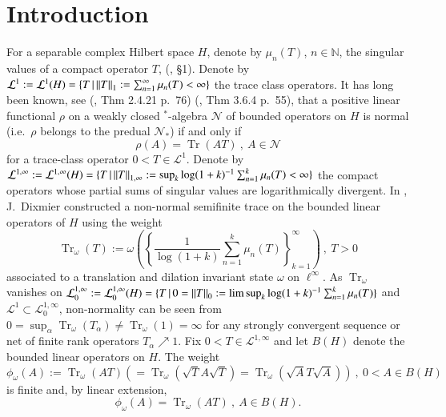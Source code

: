 \documentclass[final,1p]{elsarticle}
\numberwithin{equation}{section}
\theoremstyle{plain}
\theoremstyle{definition}
\begin{document}
\section{Introduction}

For a separable complex Hilbert space $H$, denote by $\mu_{n}(T)$, $n \in {\ensuremath{\mathbb{N}}}$, the singular values of a compact operator $T$, (\cite{S}, \S 1).
Denote by $\mathcal{L}^1:= \mathcal{L}^1(H) = {\ensuremath{\{ {T} \, | \, {{\mbox{\ensuremath{\| {T} \|}}}_1:=\sum_{n=1}^\infty \mu_n(T) < \infty} \} }}$
the trace class operators.  It has long been known, see
(\cite{BR}, Thm 2.4.21 p.~76) (\cite{Ped}, Thm 3.6.4 p.~55), that a positive linear functional $\rho$ on a weakly closed
$^*$-algebra $\mathcal{N}$ of bounded operators on $H$ is normal (i.e.~$\rho$ belongs to the predual $\mathcal{N}_*$) if and only if
\begin{equation} \label{eq:tr}
\rho(A) = \operatorname{Tr}(AT) \ , \ A \in \mathcal{N}
\end{equation}
for a trace-class operator $0 < T \in \mathcal{L}^1$.  Denote by $\mathcal{L}^{1,\infty}:= \mathcal{L}^{1,\infty}(H) = {\ensuremath{\{ {T} \, | \, {{\mbox{\ensuremath{\| {T} \|}}}_{1,\infty}:=\sup_k \log(1+k)^{-1} \sum_{n=1}^k \mu_n(T) < \infty} \} }}$ the compact operators whose partial sums of singular values are logarithmically divergent.  
In \cite{Dix}, J.~Dixmier constructed a non-normal semifinite trace on the bounded linear operators of $H$ using the weight
$$
\operatorname{Tr}_\omega(T) := \omega \left( \left\{ \frac{1}{\log(1+k)} \sum_{n=1}^k \mu_n(T)\right\}_{k=1}^\infty  \right) \ , \ T>0
$$
associated to a translation and dilation invariant state $\omega$ on $\ell^{\infty}$.  As $\operatorname{Tr}_\omega$ vanishes on $\mathcal{L}^{1,\infty}_0 := \mathcal{L}^{1,\infty}_0(H) = {\ensuremath{\{ {T} \, | \, {0 = {\mbox{\ensuremath{\| {T} \|}}}_0 := \limsup_k \log(1+k)^{-1} \sum_{n=1}^k \mu_n(T)} \} }}$ and $\mathcal{L}^1 \subset \mathcal{L}^{1,\infty}_0$,
non-normality can be seen from $0 = \sup_{\alpha} \operatorname{Tr}_\omega(T_\alpha) \not= \operatorname{Tr}_\omega(1) =\infty$ for any strongly convergent sequence or net of finite rank operators $T_\alpha \nearrow 1$.
Fix $0 < T \in \mathcal{L}^{1,\infty}$ and let $B(H)$ denote the
bounded linear operators on $H$.  The weight
$$
\phi_{\omega}(A) := \operatorname{Tr}_\omega(AT) (= \operatorname{Tr}_\omega( \sqrt{T}A\sqrt{T} ) = \operatorname{Tr}_\omega( \sqrt{A} T \sqrt{A}) ) \ , \ 0 < A \in B(H)
$$
is finite and, by linear extension,
\begin{equation} \label{eq:Dtr}
\phi_{\omega}(A) = \operatorname{Tr}_\omega(AT) \ , \ A \in B(H) .
\end{equation}
\end{document}
